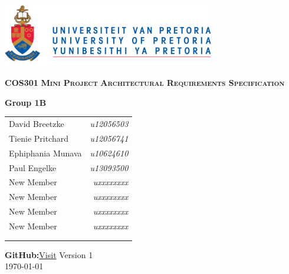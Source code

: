 \begin{titlepage}
\begin{center}
\includegraphics[width=350px]{University_of_Pretoria_Logo.png}
\newline
\newline


\begin{flushright} \large
\textbf {\textsc{\LARGE COS301}}\newline
\textbf {\textsc{\LARGE Mini Project}}\newline
\textbf {\textsc{\LARGE Architectural Requirements Specification}}\newline
\end{flushright}



\textbf{Group 1B} \\

\vspace{0.5 cm}
\begin{tabular}{lr}
David Breetzke&\emph{u12056503} \\
Tienie Pritchard&\emph{u12056741} \\
Ephiphania Munava&\emph{u10624610} \\
Paul Engelke&\emph{u13093500} \\
New Member&\emph{uxxxxxxxx} \\
New Member&\emph{uxxxxxxxx} \\
New Member&\emph{uxxxxxxxx} \\
New Member&\emph{uxxxxxxxx} \\ 
\\
\\

\end{tabular}

\vspace{1cm}
\textbf{GitHub:}\href{https://github.com/davidbreetzke/COS_301_Phase2_1B}{Visit}
\vfill
{\large Version 1}
\\
{\large \today}

\end{center}
\end{titlepage}
